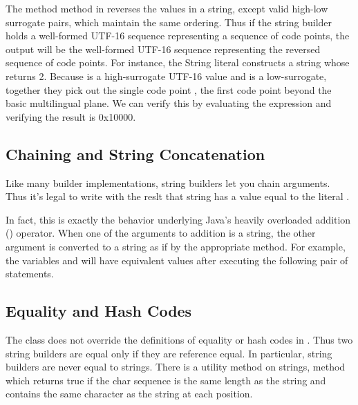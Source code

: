The method  method in  reverses
the  values in a string, except valid high-low surrogate
pairs, which maintain the same ordering.  Thus if the string builder
holds a well-formed UTF-16 sequence representing a sequence of code
points, the output will be the well-formed UTF-16 sequence
representing the reversed sequence of code points.  For instance, the
String literal  constructs a string whose
 returns 2.  Because  is a
high-surrogate UTF-16  value and  is a
low-surrogate, together they pick out the single code point
, the first code point beyond the basic multilingual
plane.  We can verify this by evaluating the expression
 and verifying the result 
is 0x10000.


\subsection{Chaining and String Concatenation}

Like many builder implementations, string builders let you chain
arguments.  Thus it's legal to write
%
%
with the reslt that string  has a value equal to the
literal .

In fact, this is exactly the behavior underlying Java's heavily
overloaded addition (\code{+}) operator.  When one of the arguments to
addition is a string, the other argument is converted to a string as
if by the appropriate  method.  For example,
the variables  and  will have equivalent values after
executing the following pair of statements.
%



\subsection{Equality and Hash Codes}

The  class does not override the definitions of
equality or hash codes in .  Thus two string builders are
equal only if they are reference equal.  In particular, string
builders are never equal to strings.  There is a utility method on
strings,  method which
returns true if the char sequence is the same length as the string and
contains the same character as the string at each position.

